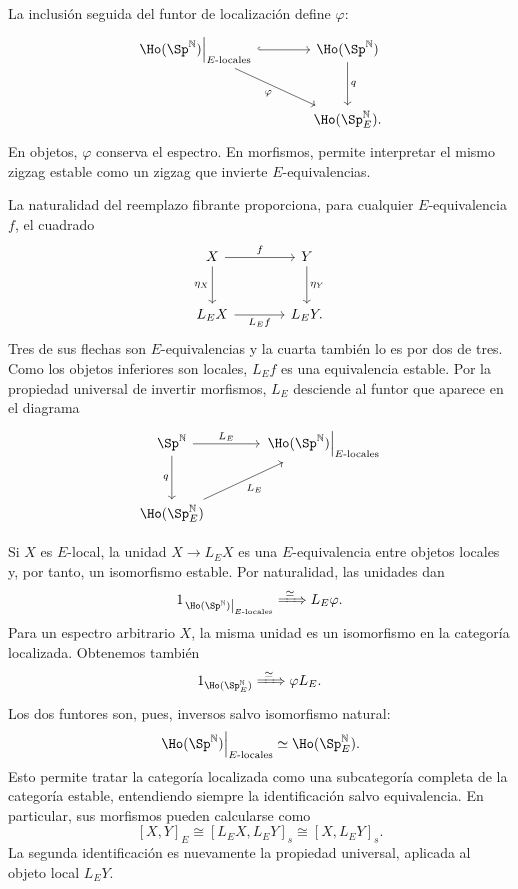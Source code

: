 La inclusión seguida del funtor de localización define $\varphi$:
\[
\begin{tikzcd}[column sep=large,row sep=large]
\left.\Ho(\Sp^{\mathbb N})\right|_{E\text{-locales}}
\arrow[r,hook]\arrow[dr,"\varphi"']
&\Ho(\Sp^{\mathbb N})\arrow[d,"q"]\\
&\Ho(\Sp_E^{\mathbb N}).
\end{tikzcd}
\]
En objetos, $\varphi$ conserva el espectro. En morfismos, permite interpretar el mismo zigzag estable como un zigzag que invierte $E$-equivalencias.

La naturalidad del reemplazo fibrante proporciona, para cualquier $E$-equivalencia $f$, el cuadrado
\[
\begin{tikzcd}[column sep=large,row sep=large]
X\arrow[r,"f"]\arrow[d,"\eta_X"']
&Y\arrow[d,"\eta_Y"]\\
L_EX\arrow[r,"L_Ef"']&L_EY.
\end{tikzcd}
\]
Tres de sus flechas son $E$-equivalencias y la cuarta también lo es por dos de tres. Como los objetos inferiores son locales, $L_Ef$ es una equivalencia estable. Por la propiedad universal de invertir morfismos, $L_E$ desciende al funtor que aparece en el diagrama
\[
\begin{tikzcd}[column sep=large,row sep=large]
\Sp^{\mathbb N}\arrow[r,"L_E"]\arrow[d,"q"']
&\left.\Ho(\Sp^{\mathbb N})\right|_{E\text{-locales}}\\
\Ho(\Sp_E^{\mathbb N})\arrow[ur,"L_E"']&
\end{tikzcd}
\]

Si $X$ es $E$-local, la unidad $X\to L_EX$ es una $E$-equivalencia entre objetos locales y, por tanto, un isomorfismo estable. Por naturalidad, las unidades dan
\[
1_{\left.\Ho(\Sp^{\mathbb N})\right|_{E\text{-locales}}}
\xRightarrow{\ \simeq\ }L_E\varphi.
\]
Para un espectro arbitrario $X$, la misma unidad es un isomorfismo en la categoría localizada. Obtenemos también
\[
1_{\Ho(\Sp_E^{\mathbb N})}\xRightarrow{\ \simeq\ }\varphi L_E.
\]
Los dos funtores son, pues, inversos salvo isomorfismo natural:
\[
\left.\Ho(\Sp^{\mathbb N})\right|_{E\text{-locales}}
\simeq\Ho(\Sp_E^{\mathbb N}).
\]
Esto permite tratar la categoría localizada como una subcategoría completa de la categoría estable, entendiendo siempre la identificación salvo equivalencia. En particular, sus morfismos pueden calcularse como
\[
[X,Y]_E\cong[L_EX,L_EY]_s\cong[X,L_EY]_s.
\]
La segunda identificación es nuevamente la propiedad universal, aplicada al objeto local $L_EY$.

